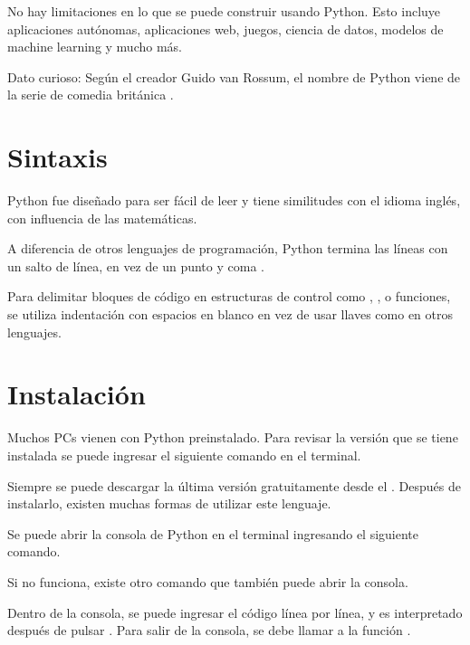 No hay limitaciones en lo que se puede construir usando Python. Esto incluye aplicaciones autónomas, aplicaciones web, juegos, ciencia de datos, modelos de machine learning y mucho más.\smallskip

Dato curioso: Según el creador Guido van Rossum, el nombre de Python viene de la serie de comedia británica .

\section{Sintaxis}

Python fue diseñado para ser fácil de leer y tiene similitudes con el idioma inglés, con influencia de las matemáticas.\smallskip

A diferencia de otros lenguajes de programación, Python termina las líneas con un salto de línea, en vez de un punto y coma \ttt{;}.\smallskip

Para delimitar bloques de código en estructuras de control como , ,  o funciones, se utiliza indentación con espacios en blanco en vez de usar llaves \ttt{\{\}} como en otros lenguajes.

\section{Instalación}

Muchos PCs vienen con Python preinstalado. Para revisar la versión que se tiene instalada se puede ingresar el siguiente comando en el terminal.


Siempre se puede descargar la última versión gratuitamente desde el . Después de instalarlo, existen muchas formas de utilizar este lenguaje.\smallskip

Se puede abrir la consola de Python en el terminal ingresando el siguiente comando.


Si no funciona, existe otro comando que también puede abrir la consola.


Dentro de la consola, se puede ingresar el código línea por línea, y es interpretado después de pulsar . Para salir de la consola, se debe llamar a la función .

